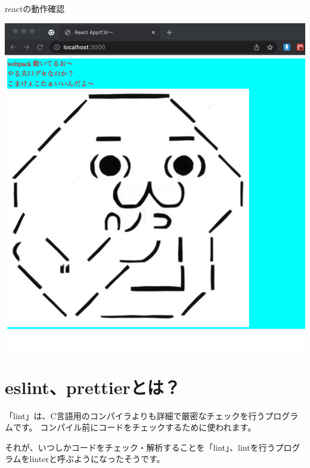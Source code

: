 \def\startercodeblockfontsize{}
\begin{starterterminal}[]{reactの動作確認}\end{starterterminal}
\begin{reviewimage}%
\includegraphics[width=1.0\maxwidth]{./images/02-create-react-app/babel09.png}%
\label{image:02-create-react-app:babel09}
\end{reviewimage}

\section{eslint、prettierとは？}
\keeplastskip{
  \label{sec:2-3}
  \label{sec-03lint}
  \par\nobreak
}

「lint」は、C言語用のコンパイラよりも詳細で厳密なチェックを行うプログラムです。
コンパイル前にコードをチェックするために使われます。

\vspace*{\baselineskip}

それが、いつしかコードをチェック・解析することを「lint」、lintを行うプログラムをlinterと呼ぶようになったそうです。


